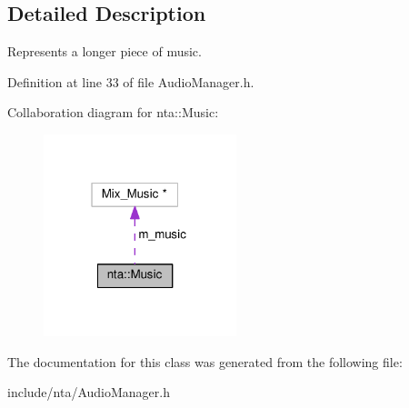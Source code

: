 \subsection{Detailed Description}
Represents a longer piece of music. 

Definition at line 33 of file Audio\+Manager.\+h.



Collaboration diagram for nta\+:\+:Music\+:\nopagebreak
\begin{figure}[H]
\begin{center}
\leavevmode
\includegraphics[width=159pt]{d5/d16/classnta_1_1Music__coll__graph}
\end{center}
\end{figure}


The documentation for this class was generated from the following file\+:\begin{DoxyCompactItemize}
\item 
include/nta/Audio\+Manager.\+h\end{DoxyCompactItemize}
